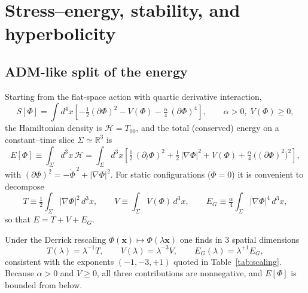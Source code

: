 \documentclass{article}
\begin{document}
\section{Stress–energy, stability, and hyperbolicity}
\label{sec:Tmunu-stability}
\subsection{ADM-like split of the energy}
\label{subsec:ADMsplit}

Starting from the flat-space action with quartic derivative interaction,
\begin{equation}
S[\Phi] = \int d^4x \left[-\tfrac12 (\partial\Phi)^2 - V(\Phi) - \tfrac{\alpha}{4}\,(\partial\Phi)^4\right],
\qquad \alpha>0,\; V(\Phi)\ge0,
\label{eq:flat_action_quartic}
\end{equation}
the Hamiltonian density is $\mathcal{H}=T_{00}$, and the total (conserved) energy on a constant–time slice $\Sigma\simeq\mathbb{R}^3$ is
\begin{equation}
E[\Phi] \equiv \int_{\Sigma}\! d^3x \,\mathcal{H}
= \int_{\Sigma}\! d^3x \left[\tfrac12\,(\partial_t\Phi)^2 + \tfrac12\,|\nabla\Phi|^2
+ V(\Phi) + \tfrac{\alpha}{4}\, \big((\partial\Phi)^2\big)^2 \right],
\label{eq:total_energy_def}
\end{equation}
with $(\partial\Phi)^2=-\dot\Phi^{\,2}+|\nabla\Phi|^2$. For static configurations ($\dot\Phi=0$) it is convenient to decompose
\begin{equation}
T \equiv \tfrac12\!\int_{\Sigma} |\nabla\Phi|^2\, d^3x, 
\qquad
V \equiv \int_{\Sigma} V(\Phi)\, d^3x,
\qquad
E_G \equiv \tfrac{\alpha}{4}\!\int_{\Sigma}\! |\nabla\Phi|^4\, d^3x,
\label{eq:TVEG_defs}
\end{equation}
so that $E = T + V + E_G$.

Under the Derrick rescaling $\Phi(\mathbf{x})\mapsto \Phi(\lambda\mathbf{x})$ one finds in $3$ spatial dimensions
\begin{equation}
T(\lambda)=\lambda^{-1} T, \qquad
V(\lambda)=\lambda^{-3} V,\qquad
E_G(\lambda)=\lambda^{+1} E_G,
\label{eq:scalings}
\end{equation}
consistent with the exponents $(-1,-3,+1)$ quoted in Table~\ref{tab:scaling}. Because $\alpha>0$ and $V\ge0$, all three contributions are nonnegative, and $E[\Phi]$ is bounded from below.
\end{document}
